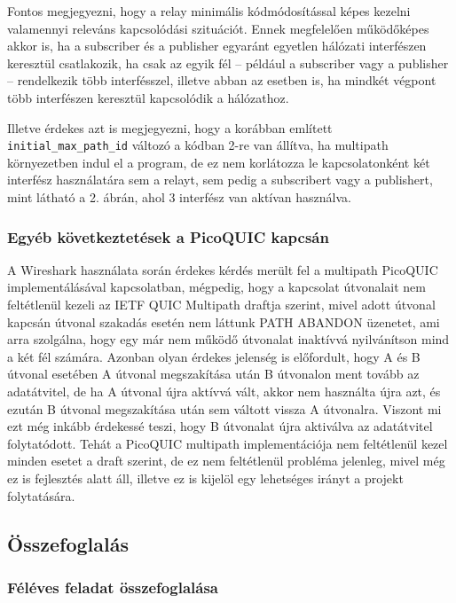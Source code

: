 \documentclass[a4paper,oneside]{article}
\begin{document}
Fontos megjegyezni, hogy a relay minimális kódmódosítással képes kezelni valamennyi 
releváns kapcsolódási szituációt. Ennek megfelelően működőképes akkor is, ha a subscriber és a 
publisher egyaránt egyetlen hálózati interfészen keresztül csatlakozik, ha csak az egyik 
fél – például a subscriber vagy a publisher – rendelkezik több interfésszel, illetve abban 
az esetben is, ha mindkét végpont több interfészen keresztül kapcsolódik a hálózathoz.


Illetve érdekes azt is megjegyezni, hogy a korábban említett 
  \texttt{initial\_max\_path\_id}
változó a kódban 2-re van állítva, ha multipath környezetben indul el a program,
de ez nem korlátozza le kapcsolatonként két interfész használatára sem a relayt, sem pedig a 
subscribert vagy a publishert, mint látható a 2. ábrán, ahol 3 interfész van aktívan használva.

\subsubsection{Egyéb következtetések a PicoQUIC kapcsán}

A Wireshark használata során érdekes kérdés merült fel a multipath PicoQUIC implementálásával kapcsolatban,
mégpedig, hogy a kapcsolat útvonalait nem feltétlenül kezeli az IETF QUIC Multipath draftja szerint, mivel adott útvonal kapcsán útvonal szakadás 
esetén nem láttunk PATH ABANDON üzenetet, ami arra szolgálna, hogy egy már nem működő útvonalat inaktívvá nyilvánítson mind a két fél számára.
Azonban olyan érdekes jelenség is előfordult, hogy A és B útvonal esetében A útvonal megszakítása után B útvonalon ment tovább az adatátvitel,
de ha A útvonal újra aktívvá vált, akkor nem használta újra azt, és ezután B útvonal megszakítása után sem váltott vissza A útvonalra. Viszont mi ezt még inkább
érdekessé teszi, hogy B útvonalat újra aktiválva az adatátvitel folytatódott. Tehát a PicoQUIC multipath implementációja nem feltétlenül
kezel minden esetet a draft szerint, de ez nem feltétlenül probléma jelenleg, mivel még ez is fejlesztés alatt áll, illetve ez is kijelöl egy lehetséges 
irányt a projekt folytatására.

\subsection{Összefoglalás}
\label{sec:osszefoglalas}

\subsubsection{Féléves feladat összefoglalása}
\end{document}

